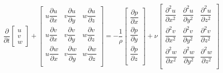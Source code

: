 \documentclass[12pt,a4paper]{article}
\numberwithin{equation}{section}
\begin{document}
\renewcommand{\arraystretch}{2}
\begin{equation}
\frac{\partial}{\partial t} \begin{bmatrix}
u \\
v \\
w 
\end{bmatrix} +
\begin{bmatrix}
u \dfrac{\partial u}{\partial x} & v \dfrac{\partial u}{\partial y} & w \dfrac{\partial u}{\partial z} \\
u \dfrac{\partial v}{\partial x} & v \dfrac{\partial v}{\partial y} & w \dfrac{\partial v}{\partial z} \\
u \dfrac{\partial w}{\partial x} & v \dfrac{\partial w}{\partial y} & w \dfrac{\partial w}{\partial z} \\
\end{bmatrix} =
-\dfrac{1}{\rho}
\begin{bmatrix}
\dfrac{\partial p}{\partial x} \\
\dfrac{\partial p}{\partial y} \\
\dfrac{\partial p}{\partial z} \\
\end{bmatrix} +
\nu 
\begin{bmatrix}
\dfrac{\partial^2 u}{\partial x^2} & \dfrac{\partial^2 u}{\partial y^2} & \dfrac{\partial^2 u}{\partial z^2} \\
\dfrac{\partial^2 v}{\partial x^2} & \dfrac{\partial^2 v}{\partial y^2} & \dfrac{\partial^2 v}{\partial z^2} \\
\dfrac{\partial^2 w}{\partial x^2} & \dfrac{\partial^2 w}{\partial y^2} & \dfrac{\partial^2 w}{\partial z^2} \\
\end{bmatrix}
\end{equation}
\end{document}
